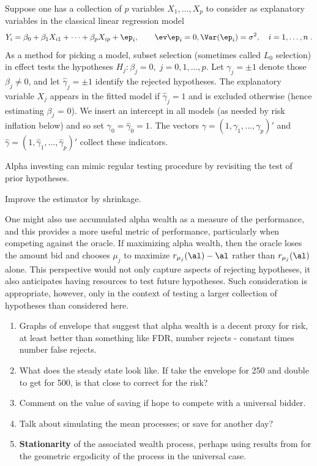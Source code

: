 \documentclass[12pt]{article}
\begin{document}
  Suppose one has a collection of $p$ variables $X_1, \ldots, X_p$ to consider as
 explanatory variables in the classical linear regression model
 \begin{equation}
   Y_i = \beta_0 + \beta_1 X_{i1} + \cdots + \beta_p X_{ip} + \ep_i, 
     \qquad \ev \ep_i = 0, \Var(\ep_i)=\sigma^2,  \quad i = 1,\ldots,n\;.
 \label{eq:regr}
 \end{equation}
 As a method for picking a model, subset selection (sometimes called $L_0$
 selection) in effect tests the hypotheses $H_j: \beta_j = 0, \; j = 0, 1, \ldots, p$.
  Let $\gamma_j = \pm 1$ denote those $\beta_j \ne 0$, and let $\hat\gamma_j =
 \pm 1$ identify the rejected hypotheses.  The explanatory variable $X_j$
 appears in the fitted model if $\hat\gamma_j = 1$ and is excluded otherwise
 (hence estimating $\beta_j$ = 0).  We insert an intercept in all models (as
 needed by risk inflation below) and so set $\gamma_0=\hat\gamma_0 = 1$.  The
 vectors $\gamma = (1, \gamma_1, \ldots, \gamma_p)'$ and $\hat\gamma = (1,
 \hat\gamma_1, \ldots, \hat\gamma_p)'$ collect these indicators.


Alpha investing can mimic regular testing procedure by revisiting the test of
prior hypotheses. 

Improve the estimator by shrinkage.



 One might also use accumulated alpha wealth as a measure of the performance, and
 this provides a more useful metric of performance, particularly when competing
 against the oracle.  If maximizing alpha wealth, then the oracle loses the
 amount bid and chooses $\mu_j$ to maximize $r_{\mu_j}(\al)-\al$ rather than
 $r_{\mu_j}(\al)$ alone.  This perspective would not only capture aspects of
 rejecting hypotheses, it also anticipates having resources to test future
 hypotheses.  Such consideration is appropriate, however, only in the context of
 testing a larger collection of hypotheses than considered here.

 \begin{enumerate}

 \item Graphs of envelope that suggest that alpha wealth is a decent proxy for
 risk, at least better than something like FDR, number rejects - constant times
 number false rejects.

 \item What does the steady state look like.  If take the envelope for 250 and
 double to get for 500, is that close to correct for the risk?

 \item Comment on the value of saving if hope to compete with a universal
 bidder.

 \item  Talk about simulating the mean processes; or save for another day? 
 
\item {\bf Stationarity} of the associated wealth process, perhaps using results
 from \citet{chanTong94} for the geometric ergodicity of the process in the
 universal case.

\end{enumerate}
\end{document}
